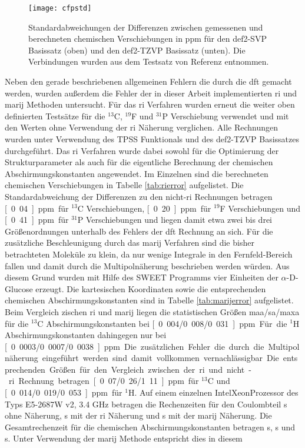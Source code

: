 \begin{figure}[ht!]
	\centering
	\texttt{[image: cfpstd]}
	\captionsetup{figurewithin = chapter}
	\captionsetup{font=small, labelfont=bf}\caption[Standardabweichungen für unterschiedliche Funktionale und Basissätze]{Standardabweichungen der Differenzen zwischen gemessenen und berechneten chemischen Verschiebungen in ppm für den def2-SVP Basissatz (oben) und den def2-TZVP Basissatz (unten). Die Verbindungen wurden aus dem Testsatz von Referenz \cite{gauss1993effects} entnommen.} 
\label{abb:cfpshifts}
\end{figure}

\FloatBarrier
Neben den gerade beschriebenen allgemeinen Fehlern die durch die \ac{dft} gemacht werden, wurden außerdem die Fehler der in dieser Arbeit implementierten \ac{ri} und \ac{marij} Methoden untersucht. Für das \ac{ri} Verfahren wurden erneut die weiter oben definierten Testsätze für die $^{13}$C, $^{19}$F und $^{31}$P Verschiebung verwendet und mit den Werten ohne Verwendung der \ac{ri} Näherung verglichen. Alle Rechnungen wurden unter Verwendung des TPSS Funktionals und des def2-TZVP Basissatzes durchgeführt. Das \ac{ri} Verfahren wurde dabei sowohl für die Optimierung der Strukturparameter als auch für die eigentliche Berechnung der chemischen Abschirmungskonstanten angewendet. Im Einzelnen sind die berechneten chemischen Verschiebungen in Tabelle \ref{tab:rierror} aufgelistet. Die Standardabweichung der Differenzen zu den nicht-\ac{ri} Rechnungen betragen \unit[0.04]{ppm} für $^{13}$C Verschiebungen, \unit[0.20]{ppm} für $^{19}$F Verschiebungen und \unit[0.41]{ppm} für $^{31}$P Verschiebungen und liegen damit etwa zwei bis drei Größenordnungen unterhalb des Fehlers der \ac{dft} Rechnung an sich. Für die zusätzliche Beschleunigung durch das \ac{marij} Verfahren sind die bisher betrachteten Moleküle zu klein, da nur wenige Integrale in den Fernfeld-Bereich fallen und damit durch die Multipolnäherung beschrieben werden würden. Aus diesem Grund wurden mit Hilfe des SWEET\supercite{bohne1999sweet} Programms vier Einheiten der $\alpha$-D-Glucose erzeugt. Die kartesischen Koordinaten sowie die entsprechenden chemischen Abschirmungskonstanten sind in Tabelle \ref{tab:marijerror} aufgelistet. Beim Vergleich zischen \ac{ri} und \ac{marij} liegen die statistischen Größen \ac{maa}/\ac{sa}/\ac{maxa} für die $^{13}$C Abschirmungskonstanten bei \unit[0.004/0.008/0.031]{ppm}. Für die $^{1}$H Abschirmungskonstanten dahingegen nur bei \unit[0.0003/0.0007/0.0038]{ppm}. Die zusätzlichen Fehler die durch die Multipolnäherung eingeführt werden sind damit vollkommen vernachlässigbar. Die entsprechenden Größen für den Vergleich zwischen der \ac{ri} und nicht-\ac{ri} Rechnung betragen \unit[0.07/0.26/1.11]{ppm} für $^{13}$C und \unit[0.014/0.019/0.053]{ppm} für $^{1}$H. Auf einem einzelnen Intel\textregistered Xeon\textregistered Prozessor des Typs E5-2687W v2, 3.4 GHz betragen die Rechenzeiten für den Coulombteil \unit[4099]{s} ohne Näherung, \unit[220]{s} mit der \ac{ri} Näherung und \unit[117]{s} mit der \ac{marij} Näherung. Die Gesamtrechenzeit für die chemischen Abschirmungskonstanten betragen \unit[4610]{s}, \unit[741]{s} und \unit[633]{s}. Unter Verwendung der \ac{marij} Methode entspricht dies in diesem 